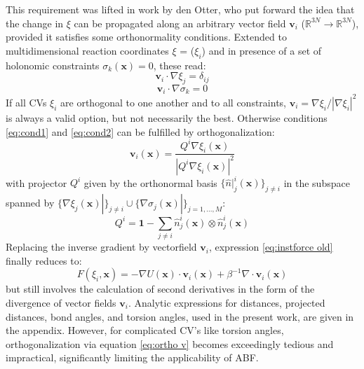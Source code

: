 This requirement was lifted in work by den Otter\autocite{den2000thermodynamic}, who put forward the idea that the change in $\xi$ can be propagated along an arbitrary vector field $\textbf{v}_i$ ($\mathbb{R}^{3N} \to \mathbb{R}^{3N}$), provided it satisfies some orthonormality conditions.
Extended to multidimensional reaction coordinates \textbf{$\xi$} = ($\xi_i$) and in presence of a set of holonomic constraints $\sigma_{k}(\textbf{x})=0$, these read:\autocite{ciccotti2005blue}
\begin{equation}
  \textbf{v}_i \cdot \nabla \xi_j = \delta_{ij} \label{eq:cond1}
\end{equation}
\begin{equation}
  \textbf{v}_i \cdot \nabla \sigma_k = 0 \label{eq:cond2}
\end{equation}
If all CVs $\xi_i$ are orthogonal to one another and to all constraints, $\textbf{v}_i = \nabla \xi_i/|\nabla \xi_i|^2$ is always a valid option, but not necessarily the best.
Otherwise conditions \ref{eq:cond1} and \ref{eq:cond2} can be fulfilled by orthogonalization:\autocite{ciccotti2005blue}
\begin{equation}
  \textbf{v}_i (\textbf{x}) = \frac{Q^i \nabla \xi_i (\textbf{x})}{|Q^i \nabla \xi_i (\textbf{x})|^2} \label{eq:ortho v}
\end{equation}
with projector $Q^i$ given by the orthonormal basis $\{\hat{n}|_{j}^{i}(\textbf{x})\}_{j\neq i}$ in the subspace spanned by $\{\nabla \xi_j (\textbf{x})|\}_{j\neq i} \cup \{\nabla\sigma_j (\textbf{x})|\}_{j=1,...,M}$:
\begin{equation}
  Q^i = \textbf{1} - \sum_{j \neq i} \hat{n}_{j}^{i}(\textbf{x}) \otimes \hat{n}_{j}^{i}(\textbf{x})
\end{equation}
Replacing the inverse gradient by vectorfield $\textbf{v}_i$, expression \ref{eq:instforce old} finally reduces to:
\begin{equation}
  F(\xi_i,\textbf{x}) = -\nabla U(\textbf{x}) \cdot \textbf{v}_i(\textbf{x}) + \beta^{-1} \nabla \cdot \textbf{v}_i(\textbf{x}) \label{eq:inst ABF force}
\end{equation}
but still involves the calculation of second derivatives in the form of the divergence of vector fields $\textbf{v}_i$.\autocite{comer2015adaptive} Analytic expressions for distances, projected distances, bond angles, and torsion angles, used in the present work, are given in the appendix. However, for complicated CV's like torsion angles, orthogonalization via equation \ref{eq:ortho v} becomes exceedingly tedious and impractical, significantly limiting the applicability of ABF.

